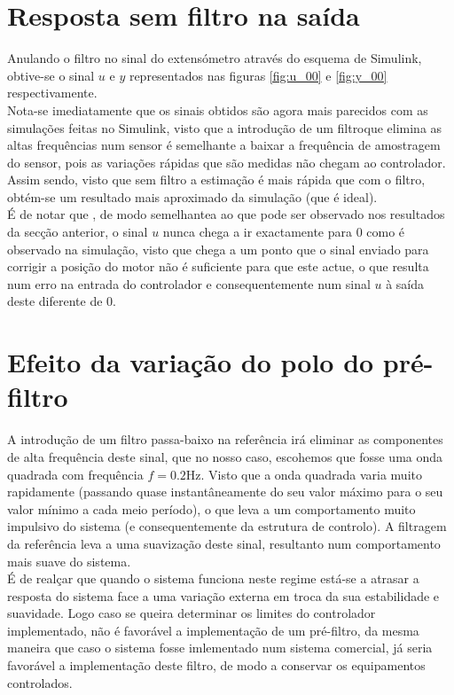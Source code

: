 \documentclass[%
  reprint,
  nofootinbib,
  amsmath,amssymb,
  aps,
  10pt,
  a4paper
]{revtex4-1}
\begin{document}
\section{Resposta sem filtro na saída}
Anulando o filtro no sinal do extensómetro através do esquema de Simulink, obtive-se o sinal $u$ e $y$ representados nas figuras \ref{fig:u_00} e \ref{fig:y_00} respectivamente.\\
Nota-se imediatamente que os sinais obtidos são agora mais parecidos com as simulações feitas no Simulink, visto que a introdução de um filtroque elimina as altas frequências num sensor é semelhante a baixar a frequência de amostragem do sensor, pois as variações rápidas que são medidas não chegam ao controlador. Assim sendo, visto que sem filtro a estimação é mais rápida que com o filtro, obtém-se um resultado mais aproximado da simulação (que é ideal).\\
É de notar que , de modo semelhantea ao que pode ser observado nos resultados da secção anterior, o sinal $u$ nunca chega a ir exactamente para 0 como é observado na simulação, visto que chega a um ponto que o sinal enviado para corrigir a posição do motor não é suficiente para que este actue, o que resulta num erro na entrada do controlador e consequentemente num sinal $u$ à saída deste diferente de 0.
\section{Efeito da variação do polo do pré-filtro}
A introdução de um filtro passa-baixo na referência irá eliminar as componentes de alta frequência deste sinal, que no nosso caso, escohemos que fosse uma onda quadrada com frequência $f=0.2$Hz. Visto que a onda quadrada varia muito rapidamente (passando quase instantâneamente do seu valor máximo para o seu valor mínimo a cada meio período), o que leva a um comportamento muito impulsivo do sistema (e consequentemente da estrutura de controlo). A filtragem da referência leva a uma suavização deste sinal, resultanto num comportamento mais suave do sistema.\\
É de realçar que quando o sistema funciona neste regime está-se a atrasar a resposta do sistema face a uma variação externa em troca da sua estabilidade e suavidade. Logo caso se queira determinar os limites do controlador implementado, não é favorável a implementação de um pré-filtro, da mesma maneira que caso o sistema fosse imlementado num sistema comercial, já seria favorável a implementação deste filtro, de modo a conservar os equipamentos controlados.
\end{document}
